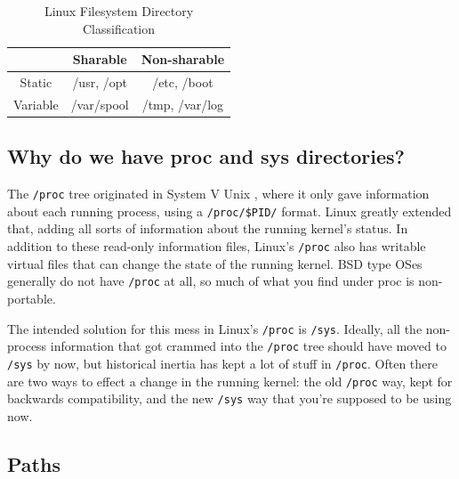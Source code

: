 \begin{table}[h!]
\caption{Linux Filesystem Directory Classification}
\begin{tabular}{ c | c c }
  \toprule
  & Sharable & Non-sharable \\
 \midrule
  Static & /usr, /opt & /etc, /boot \\
  Variable & /var/spool & /tmp, /var/log \\
 \bottomrule
\end{tabular}
\end{table}

\subsection{Why do we have proc and sys directories?}

The \texttt{/proc} tree originated in System V Unix
, where it only gave information about each running process, using a
\texttt{/proc/\$PID/} format. Linux greatly extended that, adding all sorts of information about the running kernel's status. In addition to these read-only information files, Linux's \texttt{/proc} also has writable virtual files that can change the state of the running kernel.
BSD
type OSes generally do not have \texttt{/proc} at all, so much of what you find under proc is non-portable.

The intended solution for this mess in Linux's \texttt{/proc} is \texttt{/sys}. Ideally, all the non-process information that got crammed into the \texttt{/proc} tree should have moved to \texttt{/sys} by now, but historical inertia has kept a lot of stuff in \texttt{/proc}.
Often there are two ways to effect a change in the running kernel: the old \texttt{/proc} way, kept for backwards compatibility, and the new \texttt{/sys} way that you're supposed to be using now.


\subsection{Paths}

